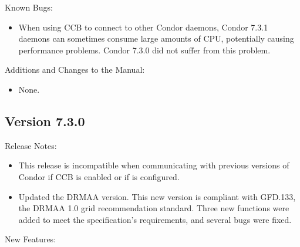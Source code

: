 \noindent Known Bugs:

\begin{itemize}

\item When using CCB to connect to other Condor daemons, Condor 7.3.1
daemons can sometimes consume large amounts of CPU, potentially
causing performance problems.  Condor 7.3.0 did not suffer from this
problem.

\end{itemize}

\noindent Additions and Changes to the Manual:

\begin{itemize}

\item None.

\end{itemize}

\subsection*{\label{sec:New-7-3-0}Version 7.3.0}

\noindent Release Notes:

\begin{itemize}

\item This release is incompatible when communicating with
previous versions of Condor if CCB is enabled or if
 is configured.

\item Updated the DRMAA version.
This new version is compliant with GFD.133,
the DRMAA 1.0 grid recommendation standard.
Three new functions were added to meet the specification's requirements,
and several bugs were fixed.

\end{itemize}


\noindent New Features:

